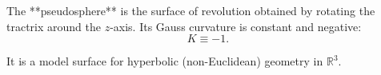 The **pseudosphere** is the surface of revolution obtained by rotating the tractrix around the $z$-axis. Its Gauss curvature is constant and negative:
$$K \equiv -1.$$

It is a model surface for hyperbolic (non-Euclidean) geometry in $\mathbb{R}^3$.
